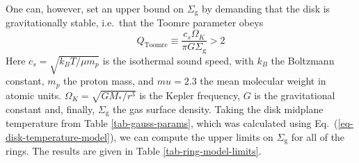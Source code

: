 \documentclass{aa}
\begin{document}
One can, however, set an upper bound on $\Sigma_{\mathrm{g}}$ by demanding that
the disk is gravitationally stable, i.e.\ that the Toomre parameter obeys
\begin{equation}
Q_{\mathrm{Toomre}}\equiv \frac{c_s\Omega_K}{\pi G \Sigma_{\mathrm{g}}} >2
\end{equation}
Here $c_s=\sqrt{k_BT/\mu m_p}$ is the isothermal sound speed, with $k_B$ the
Boltzmann constant, $m_p$ the proton mass, and $mu=2.3$ the mean molecular
weight in atomic units. $\Omega_K=\sqrt{GM_{*}/r^3}$ is the Kepler frequency,
$G$ is the gravitational constant and, finally, $\Sigma_{\mathrm{g}}$ the gas
surface density. Taking the disk midplane
temperature from Table \ref{tab-gauss-params}, which was calculated using
Eq.~(\ref{eq-disk-temperature-model}), we can compute the upper limits on
$\Sigma_{\mathrm{g}}$ for all of the rings. The results are given in Table
\ref{tab-ring-model-limits}.
\end{document}
